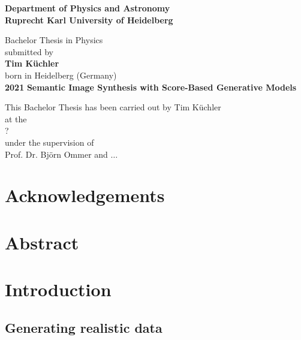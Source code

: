 \documentclass[a4paper, 12pt, oneside]{scrbook}
\begin{document}
\begin{titlepage}
\begin{center}
    \Large\textbf{Department of Physics and Astronomy\\Ruprecht Karl University of Heidelberg}
    
    \vfill
    
    \large
    Bachelor Thesis in Physics\\
    submitted by\\
    \vspace{0.5cm}
    \Large\textbf{Tim Küchler}\\
    \normalsize
    \vspace{0.5cm}
    born in Heidelberg (Germany)\\
    \vspace{0.5cm}
    \Large\textbf{2021}
    \normalsize
    \afterpage{\blankpage}
    \newpage
    \thispagestyle{empty}
    \Large\textbf{Semantic Image Synthesis with Score-Based Generative Models}
    
    \vfill
    
    \large
    This Bachelor Thesis has been carried out by Tim Küchler\\
    at the\\
    ?\\
    under the supervision of\\
    Prof. Dr. Björn Ommer and $\dots$
    \afterpage{\blankpage}
\end{center}
\end{titlepage}
%
\frontmatter

\chapter*{Acknowledgements}
\thispagestyle{empty}

\afterpage{\blankpage}

\chapter*{Abstract}

\thispagestyle{empty}
\afterpage{\blankpage}

\setcounter{tocdepth}{1}
\tableofcontents
\thispagestyle{empty}

\mainmatter
\chapter{Introduction}
\section{Generating realistic data} %
\end{document}
